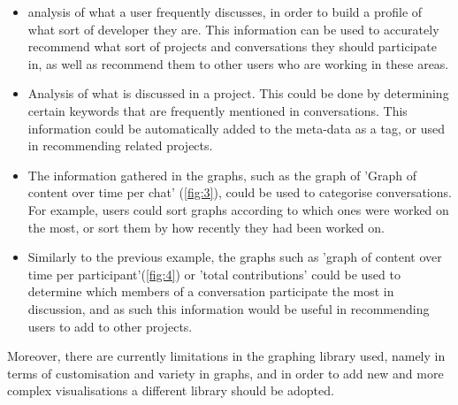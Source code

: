 \documentclass{l4proj}
\begin{document}
\begin{itemize}
\item analysis of what a user frequently discusses, in order to build a profile of what sort of developer they are.  This information can be used to accurately recommend what sort of projects and conversations they should participate in, as well as recommend them to other users who are working in these areas.  
\item Analysis of what is discussed in a project.  This could be done by determining certain keywords that are frequently mentioned in conversations.  This information could be automatically added to the meta-data as a tag, or used in recommending related projects.
\item The information gathered in the graphs, such as the graph of 'Graph of content over time per chat' (\ref{fig:3}), could be used to categorise conversations.  For example, users could sort graphs according to which ones were worked on the most, or sort them by how recently they had been worked on.
\item Similarly to the previous example, the graphs such as 'graph of content over time per participant'(\ref{fig:4}) or 'total contributions' could be used to determine which members of a conversation participate the most in discussion, and as such this information would be useful in recommending users to add to other projects.
\end{itemize}

Moreover, there are currently limitations in the graphing library used, namely in terms of customisation and variety in graphs, and in order to add new and more complex visualisations a different library should be adopted.




\begin{appendices}


\end{appendices}




\end{document}
